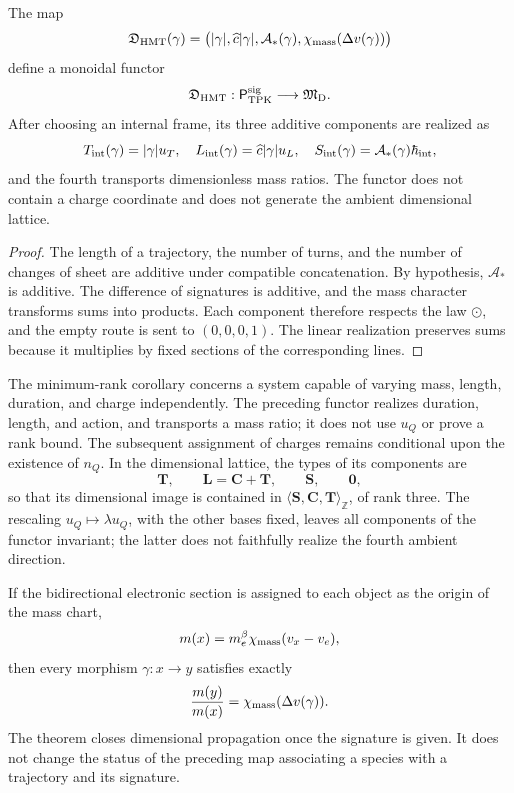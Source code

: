 \begin{theorem}
\label{thm:funtor-dimensional-minimo}
The map
\[
 \mathfrak D_{\rm HMT}(\gamma)
 =\bigl(
 |\gamma|,
 \widehat c|\gamma|,
 \mathcal A_*(\gamma),
 \chi_{\rm mass}(\Delta v(\gamma))
 \bigr)
\]
define a monoidal functor
\[
 \mathfrak D_{\rm HMT}:
 \mathsf P_{\rm TPK}^{\rm sig}\longrightarrow\mathfrak M_{\rm D}.
\]
After choosing an internal frame, its three additive components are realized as
\[
 T_{\rm int}(\gamma)=|\gamma|u_T,
 \quad
 L_{\rm int}(\gamma)=\widehat c|\gamma|u_L,
 \quad
 S_{\rm int}(\gamma)=\mathcal A_*(\gamma)\hbar_{\rm int},
\]
and the fourth transports dimensionless mass ratios. The functor does not contain
a charge coordinate and does not generate the ambient dimensional lattice.
\end{theorem}

\begin{proof}
The length of a trajectory, the number of turns, and the number of changes of
sheet are additive under compatible concatenation. By hypothesis,
\(\mathcal A_*\) is additive. The difference of signatures is additive, and the mass
character transforms sums into products. Each component therefore respects
the law \(\odot\), and the empty route is sent to
\((0,0,0,1)\). The linear realization preserves sums because it multiplies
by fixed sections of the corresponding lines.
\end{proof}

\begin{remark}
The minimum-rank corollary concerns a system capable of varying
mass, length, duration, and charge independently. The preceding
functor realizes duration, length, and action, and transports a mass ratio; it does not use
\(u_Q\) or prove a rank bound. The subsequent assignment of charges
remains conditional upon the existence of \(n_Q\). In the dimensional lattice,
the types of its components are
\[
 \mathbf T,\qquad \mathbf L=\mathbf C+\mathbf T,\qquad
 \mathbf S,\qquad \mathbf0,
\]
so that its dimensional image is contained in
\(\langle\mathbf S,\mathbf C,\mathbf T\rangle_{\mathbb Z}\), of rank three.
The rescaling \(u_Q\mapsto\lambda u_Q\), with the other bases fixed, leaves
all components of the functor invariant; the latter does not faithfully realize the
fourth ambient direction.
\end{remark}

If the bidirectional electronic section is assigned to each object as
the origin of the mass chart,
\[
 m(x)=m_e^{\beta}\chi_{\rm mass}(v_x-v_e),
\]
then every morphism \(\gamma:x\to y\) satisfies exactly
\[
 \frac{m(y)}{m(x)}
 =\chi_{\rm mass}(\Delta v(\gamma)).
\]
The theorem closes dimensional propagation once the signature is given. It
does not change the status of the preceding map associating a species with
a trajectory and its signature.

